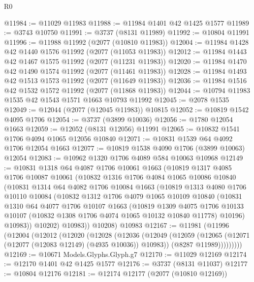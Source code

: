 \begin{lexlean}{R0}
\begin{coremodule}
@11984 := @11029 @11983
@11988 := @11984 @1401 @42 @1425 @1577
@11989 := @3743 @10750
@11991 := @3737 (@8131 @11989)
@11992 := @10804 @11991
@11996 := @11988 @11992 (@2077 (@10810 @11983))
@12004 := @11984 @1428 @42 @1440 @1576 @11992 (@2077 (@11053 @11983))
@12012 := @11984 @1443 @42 @1467 @1575 @11992 (@2077 (@11231 @11983))
@12020 := @11984 @1470 @42 @1490 @1574 @11992 (@2077 (@11461 @11983))
@12028 := @11984 @1493 @42 @1513 @1573 @11992 (@2077 (@11649 @11983))
@12036 := @11984 @1516 @42 @1532 @1572 @11992 (@2077 (@11868 @11983))
@12044 := @10794 @11983 @1535 @42 @1543 @1571 @1663 @10793 @11992
@12045 := @2078 @1535
@12049 := @12044 (@2077 (@12045 @11983)) @10815
@12052 := @10819 @1542 @4095 @1706
@12054 := @3737 (@3899 @10036)
@12056 := @1780 @12054 @1663
@12059 := @12052 (@8131 @12056) @11991
@12065 := @10832 @1541 @1706 @4094 @1065 @12056 @10840
@12071 := @10831 @1539 @64 @4092 @1706 @12054 @1663
@12077 := @10819 @1538 @4090 @1706 (@3899 @10063) @12054
@12083 := @10962 @1320 @1706 @4089 @584 @10063 @10968
@12149 := @10831
    @1318
    @64
    @4087
    @1706
    @10061
    @1663
    (@10819
      @1317
      @4085
      @1706
      @10087
      @10061
      (@10832
        @1316
        @1706
        @4084
        @1065
        @10086
        @10840
        (@10831
          @1314
          @64
          @4082
          @1706
          @10084
          @1663
          (@10819
            @1313
            @4080
            @1706
            @10110
            @10084
            (@10832
              @1312
              @1706
              @4079
              @1065
              @10109
              @10840
              (@10831
                @1310
                @64
                @4077
                @1706
                @10107
                @1663
                (@10819
                  @1309
                  @4075
                  @1706
                  @10133
                  @10107
                  (@10832 @1308 @1706 @4074 @1065 @10132 @10840 @11778)
                  @10196)
                @10983))
            @10202)
          @10983))
      @10208)
    @10983
@12167 := @11981
    (@11996
      (@12004
        (@12012
          (@12020
            (@12028
              (@12036
                (@12049
                  (@12059
                    (@12065 (@12071 (@12077 (@12083 @12149) (@4935 @10036)) @10983))
                    (@8287 @11989)))))))))
@12169 := @10671 Models.Glyphs.Glyph.g7
@12170 := @11029 @12169
@12174 := @12170 @1401 @42 @1425 @1577
@12176 := @3737 (@8131 @11037)
@12177 := @10804 @12176
@12181 := @12174 @12177 (@2077 (@10810 @12169))

\end{coremodule}
\end{lexlean}
